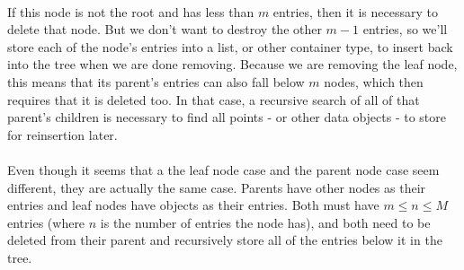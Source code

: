 \documentclass{article}
\begin{document}
\begin{multicols}{2}[]
\paragraph{}
If this node is not the root and has less than $m$ entries, then it is necessary to delete that node. But we don't want to destroy
the other $m - 1$ entries, so we'll store each of the node's entries into a list, or other container type, to insert back into
the tree when we are done removing. Because we are removing the leaf node, this means that its parent's entries can also fall below
$m$ nodes, which then requires that it is deleted too. In that case, a recursive search of all of that parent's children is necessary
to find all points - or other data objects - to store for reinsertion later.
\paragraph{}
Even though it seems that a the leaf node case and the parent node case seem different, they are actually the same case. Parents have
other nodes as their entries and leaf nodes have objects as their entries. Both must have $m \le n \le M$ entries (where $n$ is the number
of entries the node has), and both need to be deleted from their parent and recursively store all of the entries below it in the tree.




\end{multicols}
\end{document}

